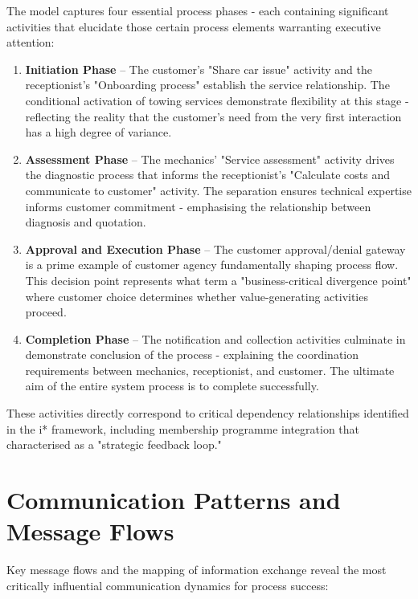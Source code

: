 \documentclass[14pt,a4paper]{article}
\begin{document}
The model captures four essential process phases - each containing significant activities that elucidate those certain process elements warranting executive attention:

\begin{enumerate}
    \item \textbf{Initiation Phase} – The customer's "Share car issue" activity and the receptionist's "Onboarding process" establish the service relationship. The conditional activation of towing services demonstrate flexibility at this stage - reflecting the reality that the customer's need from the very first interaction has a high degree of variance.

    \item \textbf{Assessment Phase} – The mechanics' "Service assessment" activity drives the diagnostic process that informs the receptionist's "Calculate costs and communicate to customer" activity. The separation ensures technical expertise informs customer commitment - emphasising the relationship between diagnosis and quotation.

    \item \textbf{Approval and Execution Phase} – The customer approval/denial gateway is a prime example of customer agency fundamentally shaping process flow. This decision point represents what \textcite[p. 185]{Allweyer2016} term a "business-critical divergence point" where customer choice determines whether value-generating activities proceed.

    \item \textbf{Completion Phase} – The notification and collection activities culminate in demonstrate conclusion of the process - explaining the coordination requirements between mechanics, receptionist, and customer. The ultimate aim of the entire system process is to complete successfully.
\end{enumerate}

These activities directly correspond to critical dependency relationships identified in the i* framework, including membership programme integration that \textcite[p. 263]{Castro2018} characterised as a "strategic feedback loop."

\section{Communication Patterns and Message Flows}

Key message flows and the mapping of information exchange reveal the most critically influential communication dynamics for process success:
\end{document}

